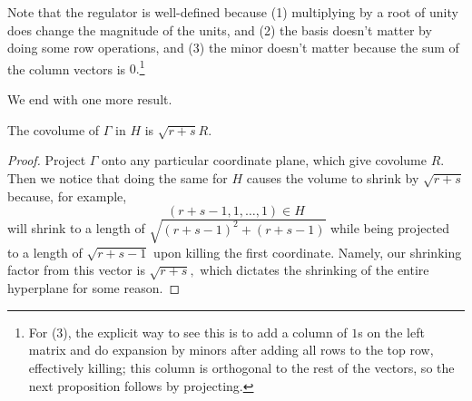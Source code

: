 Note that the regulator is well-defined because (1) multiplying by a root of unity does change the magnitude of the units, and (2) the basis doesn't matter by doing some row operations, and (3) the minor doesn't matter because the sum of the column vectors is $0.$\footnote{For (3), the explicit way to see this is to add a column of $1$s on the left matrix and do expansion by minors after adding all rows to the top row, effectively killing; this column is orthogonal to the rest of the vectors, so the next proposition follows by projecting.}

We end with one more result.
\begin{proposition}
    The covolume of $\Gamma$ in $H$ is $\sqrt{r+s}R.$
\end{proposition}
\begin{proof}
    Project $\Gamma$ onto any particular coordinate plane, which give covolume $R.$ Then we notice that doing the same for $H$ causes the volume to shrink by $\sqrt{r+s}$ because, for example,
    \[(r+s-1,1,\ldots,1)\in H\]
    will shrink to a length of $\sqrt{(r+s-1)^2+(r+s-1)}$ while being projected to a length of $\sqrt{r+s-1}$ upon killing the first coordinate. Namely, our shrinking factor from this vector is $\sqrt{r+s},$ which dictates the shrinking of the entire hyperplane for some reason.\todo{}
\end{proof}